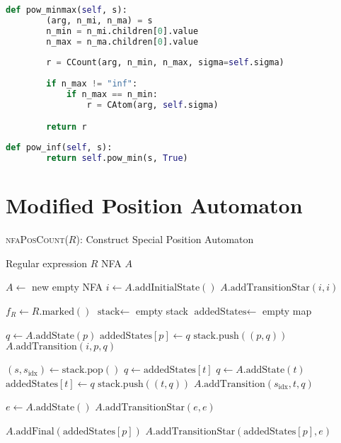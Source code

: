\begin{lstlisting}[language=Python, caption={pow\_minmax: Bounded Repetition Case}]
	def pow_minmax(self, s):
		(arg, n_mi, n_ma) = s
		n_min = n_mi.children[0].value
		n_max = n_ma.children[0].value
		
		r = CCount(arg, n_min, n_max, sigma=self.sigma)
		
		if n_max != "inf":
			if n_max == n_min:
				r = CAtom(arg, self.sigma)

		return r
\end{lstlisting}

\begin{lstlisting}[language=Python, caption={pow\_inf: Lower-bound-infinite Repetition Case}]
	def pow_inf(self, s):
		return self.pow_min(s, True)
\end{lstlisting}

\chapter{Modified Position Automaton}
\begin{algorithm}
	\caption{\textsc{nfaPosCount}($R$): Construct Special Position Automaton}
	\label{alg:nfaPosCount}
	\begin{small}
		\begin{algorithmic}[1]
			\Require Regular expression $R$
			\Ensure NFA $A$
			
			\State $A \gets$ new empty NFA
			\State $i \gets A.\text{addInitialState}()$
			\State $A.\text{addTransitionStar}(i, i)$ 
			
			\State $f_R \gets R.\text{marked}()$
			\State $\text{stack} \gets$ empty stack
			\State $\text{addedStates} \gets$ empty map
			
			\State $q \gets A.\text{addState}(p)$
			\State $\text{addedStates}[p] \gets q$
			\State $\text{stack}.\text{push}((p, q))$
			\State $A.\text{addTransition}(i, p, q)$
			\EndFor
			
			
			\State $(s, s_{\text{idx}}) \gets \text{stack}.\text{pop}()$
			\State $q \gets \text{addedStates}[t]$
			\Else
			\State $q \gets A.\text{addState}(t)$
			\State $\text{addedStates}[t] \gets q$
			\State $\text{stack}.\text{push}((t, q))$
			\EndIf
			\State $A.\text{addTransition}(s_{\text{idx}}, t, q)$
			\EndFor
			\EndWhile
			
			\State $e \gets A.\text{addState}()$
			\State $A.\text{addTransitionStar}(e, e)$
			
			\State $A.\text{addFinal}(\text{addedStates}[p])$
			\State $A.\text{addTransitionStar}(\text{addedStates}[p], e)$
			\EndIf
			\EndFor
			
		\end{algorithmic}
	\end{small}
\end{algorithm}

